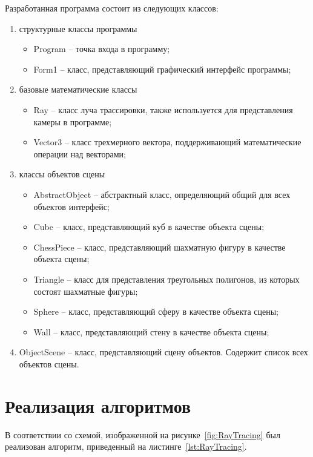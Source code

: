 Разработанная программа состоит из следующих классов:
\begin{enumerate}
	\item структурные классы программы
	\begin{itemize}
		\item Program -- точка входа в программу;
		\item Form1 -- класс, представляющий графический интерфейс программы;
	\end{itemize}
	\item базовые математические классы
	\begin{itemize}
		\item Ray -- класс луча трассировки, также используется для представления камеры в программе;
		\item Vector3 -- класс трехмерного вектора, поддерживающий математические операции над векторами;
	\end{itemize}
	\item классы объектов сцены
	\begin{itemize}
		\item AbstractObject -- абстрактный класс, определяющий общий для всех объектов интерфейс;
		\item Cube -- класс, представляющий куб в качестве объекта сцены;
		\item ChessPiece -- класс, представляющий шахматную фигуру в качестве объекта сцены;
		\item Triangle -- класс для представления треугольных полигонов, из которых состоят шахматные фигуры;
		\item Sphere -- класс, представляющий сферу в качестве объекта сцены;
		\item Wall -- класс, представляющий стену в качестве объекта сцены;
	\end{itemize}
	\item ObjectScene -- класс, представляющий сцену объектов. Содержит список всех объектов сцены.
\end{enumerate}

\section{Реализация алгоритмов}
В соответствии со схемой, изображенной на рисунке~\ref{fig:RayTracing} был реализован алгоритм, приведенный на листинге~\ref{lst:RayTracing}.

